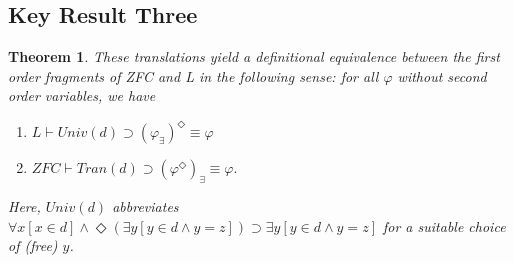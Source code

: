 \documentclass{article}
\newtheorem{theorem}{Theorem}
\begin{document}
\subsection{Key Result Three}
\begin{theorem}
These translations yield a definitional equivalence 
between the first order fragments of ZFC and L in the following sense: for all 
$\varphi$ without second order variables, we have
\begin{enumerate}
    \item $L \vdash Univ(d) \supset (\varphi_\exists)^\Diamond \equiv \varphi$
    \item $ZFC \vdash Tran(d) \supset (\varphi^\Diamond)_\exists \equiv \varphi.$
\end{enumerate}
Here, $Univ(d)$ abbreviates 
$\forall x[x \in d] \wedge \Diamond(\exists y[y \in d \wedge y = z]) 
\supset 
\exists y[y \in d \wedge y = z]$ for 
a suitable choice of (free) $y$.
\end{theorem}
\end{document}
